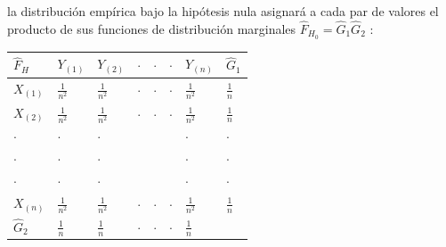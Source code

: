 \documentclass[
]{article}
\begin{document}
la distribución empírica bajo la hipótesis nula asignará a cada par de valores el producto de sus funciones de distribución marginales \(\widehat{F}_{H_{0}}=\hat{G}_{1} \hat{G}_{2}\) :

\begin{longtable}[]{@{}
  >{\raggedright\arraybackslash}p{}
  >{\centering\arraybackslash}p{}
  >{\centering\arraybackslash}p{}
  >{\raggedright\arraybackslash}p{}
  >{\raggedright\arraybackslash}p{}
  >{\raggedright\arraybackslash}p{}
  >{\centering\arraybackslash}p{}
  >{\centering\arraybackslash}p{}@{}}
\toprule\noalign{}
\begin{minipage}[b]{\linewidth}\raggedright
\(\widehat{F}_{H}\)
\end{minipage} & \begin{minipage}[b]{\linewidth}\centering
\(Y_{(1)}\)
\end{minipage} & \begin{minipage}[b]{\linewidth}\centering
\(Y_{(2)}\)
\end{minipage} & \begin{minipage}[b]{\linewidth}\raggedright
\(\cdot\)
\end{minipage} & \begin{minipage}[b]{\linewidth}\raggedright
\(\cdot\)
\end{minipage} & \begin{minipage}[b]{\linewidth}\raggedright
\(\cdot\)
\end{minipage} & \begin{minipage}[b]{\linewidth}\centering
\(Y_{(n)}\)
\end{minipage} & \begin{minipage}[b]{\linewidth}\centering
\(\hat{G}_{1}\)
\end{minipage} \\
\midrule\noalign{}
\endhead
\bottomrule\noalign{}
\endlastfoot
\(X_{(1)}\) & \(\frac{1}{n^{2}}\) & \(\frac{1}{n^{2}}\) & \(\cdot\) & \(\cdot\) & \(\cdot\) & \(\frac{1}{n^{2}}\) & \(\frac{1}{n}\) \\
\(X_{(2)}\) & \(\frac{1}{n^{2}}\) & \(\frac{1}{n^{2}}\) & \(\cdot\) & \(\cdot\) & \(\cdot\) & \(\frac{1}{n^{2}}\) & \(\frac{1}{n}\) \\
\(\cdot\) & \(\cdot\) & \(\cdot\) & & & & \(\cdot\) & \(\cdot\) \\
\(\cdot\) & \(\cdot\) & \(\cdot\) & & & & \(\cdot\) & \(\cdot\) \\
\(\cdot\) & \(\cdot\) & \(\cdot\) & & & & \(\cdot\) & \(\cdot\) \\
\(X_{(n)}\) & \(\frac{1}{n^{2}}\) & \(\frac{1}{n^{2}}\) & \(\cdot\) & \(\cdot\) & \(\cdot\) & \(\frac{1}{n^{2}}\) & \(\frac{1}{n}\) \\
\(\hat{G}_{2}\) & \(\frac{1}{n}\) & \(\frac{1}{n}\) & \(\cdot\) & \(\cdot\) & \(\cdot\) & \(\frac{1}{n}\) & \\
\end{longtable}
\end{document}
